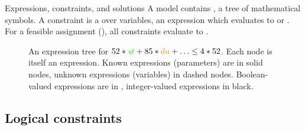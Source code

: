 \documentclass{cons-beamer}
\begin{document}
\begin{frame}{Expressions, constraints, and solutions}
	A model contains , \ie a tree of mathematical symbols. 
	A constraint is a  over variables, \ie an expression which evaluates to \true or \false.
	For a feasible assignment (\ie {}), all constraints evaluate to \true.
	
	\begin{figure}
		\caption{An expression tree for $52 * \textcolor{green}{st} + 85 * \textcolor{orange}{du} + \ldots \leq 4 * 52$. Each node is itself an expression. Known expressions (parameters) are in solid nodes, unknown expressions (variables) in dashed nodes. Boolean-valued expressions are in , integer-valued expressions in black.}
	\end{figure}
\end{frame}


\subsection{Logical constraints}

	\newcommand{\bvA}{p\xspace} %
	\newcommand{\bvB}{q\xspace}
\end{document}
